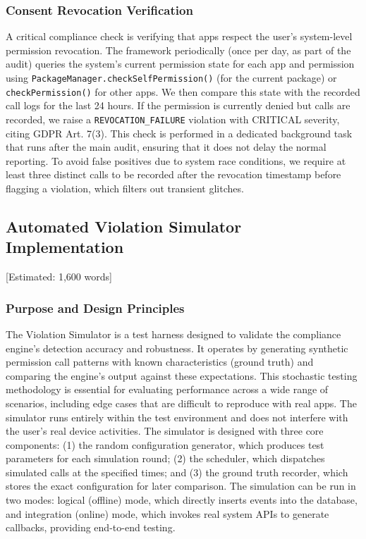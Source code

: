 \subsubsection{Consent Revocation Verification}

A critical compliance check is verifying that apps respect the user's system-level permission revocation. The framework periodically (once per day, as part of the audit) queries the system's current permission state for each app and permission using \texttt{PackageManager.checkSelfPermission()} (for the current package) or \texttt{checkPermission()} for other apps. We then compare this state with the recorded call logs for the last 24 hours. If the permission is currently denied but calls are recorded, we raise a \texttt{REVOCATION\_FAILURE} violation with CRITICAL severity, citing GDPR Art. 7(3). This check is performed in a dedicated background task that runs after the main audit, ensuring that it does not delay the normal reporting. To avoid false positives due to system race conditions, we require at least three distinct calls to be recorded after the revocation timestamp before flagging a violation, which filters out transient glitches.

\subsection{Automated Violation Simulator Implementation} [Estimated: 1,600 words]

\subsubsection{Purpose and Design Principles}

The Violation Simulator is a test harness designed to validate the compliance engine's detection accuracy and robustness. It operates by generating synthetic permission call patterns with known characteristics (ground truth) and comparing the engine's output against these expectations. This stochastic testing methodology is essential for evaluating performance across a wide range of scenarios, including edge cases that are difficult to reproduce with real apps. The simulator runs entirely within the test environment and does not interfere with the user's real device activities. The simulator is designed with three core components: (1) the random configuration generator, which produces test parameters for each simulation round; (2) the scheduler, which dispatches simulated calls at the specified times; and (3) the ground truth recorder, which stores the exact configuration for later comparison. The simulation can be run in two modes: logical (offline) mode, which directly inserts events into the database, and integration (online) mode, which invokes real system APIs to generate callbacks, providing end-to-end testing.

